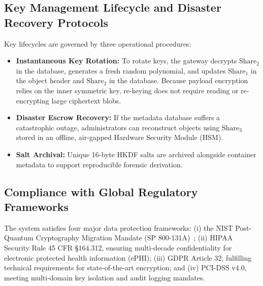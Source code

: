 \documentclass[pdflatex,sn-mathphys,Numbered]{sn-jnl}%
\theoremstyle{thmstyleone}%
\theoremstyle{thmstyletwo}%
\theoremstyle{thmstylethree}%
\begin{document}
\subsection{\textbf{Key Management Lifecycle and Disaster Recovery Protocols}}
Key lifecycles are governed by three operational procedures:
\begin{itemize}
    \item \textbf{Instantaneous Key Rotation:} To rotate keys, the gateway decrypts $\text{Share}_2$ in the database, generates a fresh random polynomial, and updates $\text{Share}_1$ in the object header and $\text{Share}_2$ in the database. Because payload encryption relies on the inner symmetric key, re-keying does not require reading or re-encrypting large ciphertext blobs.
    \item \textbf{Disaster Escrow Recovery:} If the metadata database suffers a catastrophic outage, administrators can reconstruct objects using $\text{Share}_3$ stored in an offline, air-gapped Hardware Security Module (HSM).
    \item \textbf{Salt Archival:} Unique 16-byte HKDF salts are archived alongside container metadata to support reproducible forensic derivation.
\end{itemize}

\subsection{\textbf{Compliance with Global Regulatory Frameworks}}
The system satisfies four major data protection frameworks: (i) the NIST Post-Quantum Cryptography Migration Mandate (SP 800-131A)~\cite{nist2019sp800131a,enisa2021pqc,bsi2020quantum}; (ii) HIPAA Security Rule 45 CFR \S164.312, ensuring multi-decade confidentiality for electronic protected health information (ePHI); (iii) GDPR Article 32, fulfilling technical requirements for state-of-the-art encryption; and (iv) PCI-DSS v4.0, meeting multi-domain key isolation and audit logging mandates.
\end{document}

